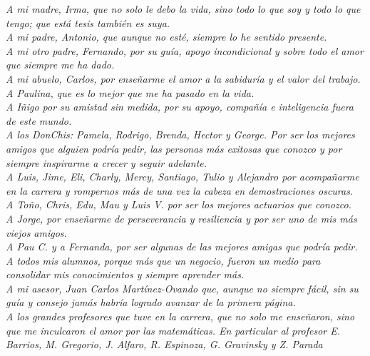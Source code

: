 \documentclass[../Main/Main.tex]{subfiles}
\begin{document}
\thispagestyle{empty}
\setcounter{page}{0} %
\begin{flushright}
	\null{}
	\emph{A mi madre, Irma, que no solo le debo la vida, sino todo lo que soy y todo lo que tengo; que está tesis también es suya.} 
	\\
	\emph{A mi padre, Antonio, que aunque no esté, siempre lo he sentido presente.} 
	\\
	\emph{A mi otro padre, Fernando, por su guía, apoyo incondicional y sobre todo el amor que siempre me ha dado.}
	\\
	\emph{A mi abuelo, Carlos, por enseñarme el amor a la sabiduría y el valor del trabajo.}	
	\\
	\emph{A Paulina, que es lo mejor que me ha pasado en la vida.}
	\\
	\emph{A Iñigo por su amistad sin medida, por su apoyo, compañía e inteligencia fuera de este mundo.}
	\\
	\emph{A los DonChis: Pamela, Rodrigo, Brenda, Hector y George. Por ser los mejores amigos que alguien podría pedir, las personas más exitosas que conozco y por siempre inspirarme a crecer y seguir adelante.}
	\\
	\emph{A Luis, Jime, Eli, Charly, Mercy, Santiago, Tulio y Alejandro por acompañarme en la carrera y rompernos más de una vez la cabeza en demostraciones oscuras.}
	\\
	\emph{A Toño, Chris, Edu, Mau y Luis V. por ser los mejores actuarios que conozco.}
	\\
	\emph{A Jorge, por enseñarme de perseverancia y resiliencia y por ser uno de mis más viejos amigos.}
	\\
	\emph{A Pau C. y a Fernanda, por ser algunas de las mejores amigas que podría pedir.}
	\\
	\emph{A todos mis alumnos, porque más que un negocio, fueron un medio para consolidar mis conocimientos y siempre aprender más.}
	\\
	\emph{A mi asesor, Juan Carlos Martínez-Ovando que, aunque no siempre fácil,  sin su guía y consejo jamás habría logrado avanzar de la primera página.}	
	\\
	\emph{A los grandes profesores que tuve en la carrera, que no solo me enseñaron, sino que me inculcaron el amor por las matemáticas. En particular al profesor E. Barrios, M. Gregorio, J. Alfaro, R. Espinoza, G. Gravinsky y Z. Parada}

\end{flushright}
\end{document}
